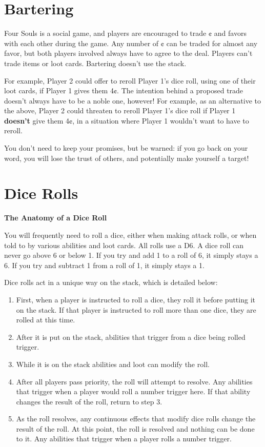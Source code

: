 \documentclass[
  fontsize=10pt,
  paper=a5,
  version=last,
  chapterprefix=true,
  bindingoffset=5mm,
  ]{scrbook}
\begin{document}
    \chapter{Bartering}
    \label{bartering}
    Four Souls is a social game, and players are encouraged to trade ¢ and favors with each other during the game. Any number of ¢ can be traded for almost any favor, but both players involved always have to agree to the deal. Players can’t trade items or loot cards. Bartering doesn’t use the stack.

    For example, Player 2 could offer to reroll Player 1’s dice roll, using one of their loot cards, if Player 1 gives them 4¢. The intention behind a proposed trade doesn’t always have to be a noble one, however! For example, as an alternative to the above, Player 2 could threaten to reroll Player 1’s dice roll if Player 1 \textbf{doesn’t} give them 4¢, in a situation where Player 1 wouldn’t want to have to reroll.

    You don’t need to keep your promises, but be warned: if you go back on your word, you will lose the trust of others, and potentially make yourself a target!

    \chapter{Dice Rolls}
    \label{dicerolls}
    \textbf{The Anatomy of a Dice Roll}

    You will frequently need to roll a dice, either when making attack rolls, or when told to by various abilities and loot cards. All rolls use a D6. A dice roll can never go above 6 or below 1. If you try and add 1 to a roll of 6, it simply stays a 6. If you try and subtract 1 from a roll of 1, it simply stays a 1.

    Dice rolls act in a unique way on the stack, which is detailed below:
    \begin{enumerate}
        \item First, when a player is instructed to roll a dice, they roll it before putting it on the stack. If that player is instructed to roll more than one dice, they are rolled at this time.
        \item After it is put on the stack, abilities that trigger from a dice being rolled trigger.
        \item While it is on the stack abilities and loot can modify the roll.
        \item After all players pass priority, the roll will attempt to resolve. Any abilities that trigger when a player would roll a number trigger here. If that ability changes the result of the roll, return to step 3.
        \item As the roll resolves, any continuous effects that modify dice rolls change the result of the roll. At this point, the roll is resolved and nothing can be done to it. Any abilities that trigger when a player rolls a number trigger.
    \end{enumerate}
\end{document}
